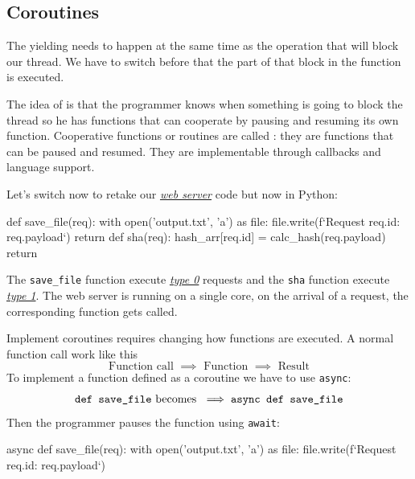     \subsection{Coroutines}
    The yielding needs to happen at the same time as the operation that will block our thread. We have to switch before that the part of that block in the function is executed. 
    \begin{tcolorbox}[vert]
        The idea of  is that the programmer knows when something is going to block the thread so he has functions that can cooperate by pausing and resuming its own function. Cooperative functions or routines are called : they are functions that can be paused and resumed. They are implementable through callbacks and language support.
    \end{tcolorbox}
    \begin{tcolorbox}[rouge]
        Let's switch now to retake our \hyperlink{server}{\textit{web server}} code but now in Python:
        \begin{codeCenter}
        \begin{Ccode}
def save_file(req):
    with open('output.txt', 'a') as file:
        file.write(f‘Request {req.id}: {req.payload}‘)
    return
def sha(req):
    hash_arr[req.id] = calc_hash(req.payload)
    return
        \end{Ccode}
        \end{codeCenter}
        The \texttt{save\_file} function execute \hyperlink{type0}{\textit{type 0}} requests and the \texttt{sha} function execute \hyperlink{type0}{\textit{type 1}}. The web server is running on a single core, on the arrival of a request, the corresponding function gets called.
    \end{tcolorbox}
    Implement coroutines requires changing how functions are executed. A normal function call work like this 
    \[\text{Function call } \implies \text{ Function } \implies \text{ Result}\]
    To implement a function defined as a coroutine we have to use \texttt{async}:
    \[\text{\texttt{def save\_file} becomes } \implies \text{\texttt{async def save\_file}}\]
    Then the programmer pauses the function using \texttt{await}: 
    \begin{codeCenter}
    \begin{Ccode}
async def save_file(req):
    with open('output.txt', 'a') as file:
        file.write(f‘Request {req.id}: {req.payload}‘)
    \end{Ccode}
    \end{codeCenter}
